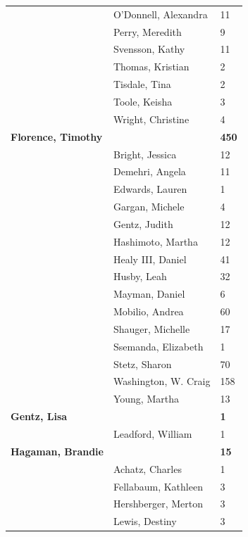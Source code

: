 \documentclass{article}\usepackage[]{graphicx}\usepackage[]{color}
\begin{document}
{\begin{longtable} { >{\raggedright}p{}|p{}p{}}
   \rowcolor[gray]{0.90} & O'Donnell, Alexandra & 11 \\ 
   \rowcolor[gray]{0.90} & Perry, Meredith & 9 \\ 
   & Svensson, Kathy & 11 \\ 
   & Thomas, Kristian & 2 \\ 
   & Tisdale, Tina & 2 \\ 
   \rowcolor[gray]{0.90} & Toole, Keisha & 3 \\ 
   \rowcolor[gray]{0.90} & Wright, Christine & 4 \\ 
   \rowcolor[gray]{0.90}\textbf{Florence, Timothy} &  & \hspace{2cm}\textbf{450} \\ 
   & Bright, Jessica & 12 \\ 
   & Demehri, Angela & 11 \\ 
   & Edwards, Lauren & 1 \\ 
   \rowcolor[gray]{0.90} & Gargan, Michele & 4 \\ 
   \rowcolor[gray]{0.90} & Gentz, Judith & 12 \\ 
   \rowcolor[gray]{0.90} & Hashimoto, Martha & 12 \\ 
   & Healy III, Daniel & 41 \\ 
   & Husby, Leah & 32 \\ 
   & Mayman, Daniel & 6 \\ 
   \rowcolor[gray]{0.90} & Mobilio, Andrea & 60 \\ 
   \rowcolor[gray]{0.90} & Shauger, Michelle & 17 \\ 
   \rowcolor[gray]{0.90} & Ssemanda, Elizabeth & 1 \\ 
   & Stetz, Sharon & 70 \\ 
   & Washington, W. Craig & 158 \\ 
   & Young, Martha & 13 \\ 
   \rowcolor[gray]{0.90}\textbf{Gentz, Lisa} &  & \hspace{2cm}\textbf{1} \\ 
   \rowcolor[gray]{0.90} & Leadford, William & 1 \\ 
   \rowcolor[gray]{0.90}\textbf{Hagaman, Brandie} &  & \hspace{2cm}\textbf{15} \\ 
   & Achatz, Charles & 1 \\ 
   & Fellabaum, Kathleen & 3 \\ 
   & Hershberger, Merton & 3 \\ 
   \rowcolor[gray]{0.90} & Lewis, Destiny & 3 \\ 

\end{longtable}}
\end{document}
